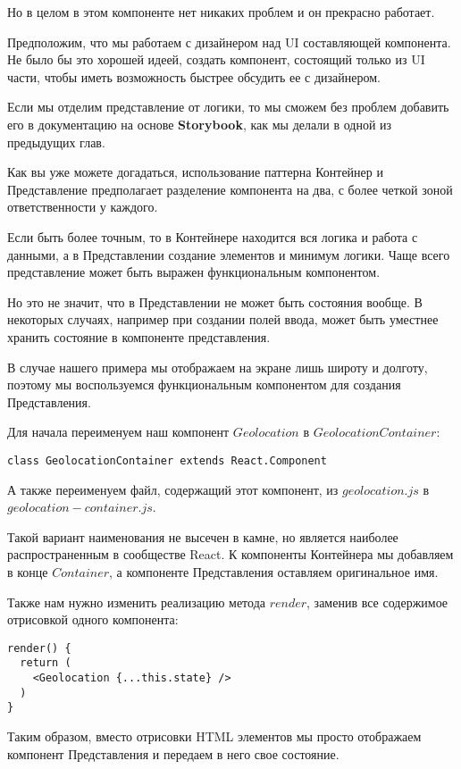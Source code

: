 Но в целом в этом компоненте нет никаких проблем и он прекрасно работает.

Предположим, что мы работаем с дизайнером над UI составляющей компонента. Не было бы это хорошей идеей, создать компонент, состоящий только из UI части, чтобы иметь возможность быстрее обсудить ее с дизайнером.

 Если мы отделим представление от логики, то мы сможем без проблем добавить его в документацию на основе \textbf{Storybook}, как мы делали в одной из предыдущих глав.
 
 Как вы уже можете догадаться, использование паттерна Контейнер и Представление предполагает разделение компонента на два, с более четкой зоной ответственности у каждого.
 
 Если быть более точным, то в Контейнере находится вся логика и работа с данными, а в Представлении создание элементов и минимум логики. Чаще всего представление может быть выражен функциональным компонентом.
 
 Но это не значит, что в Представлении не может быть состояния вообще. В некоторых случаях, например при создании полей ввода, может быть уместнее хранить состояние в компоненте представления.
 
 В случае нашего примера мы отображаем на экране лишь широту и долготу, поэтому мы воспользуемся функциональным компонентом для создания Представления.
 
 Для начала переименуем наш компонент $Geolocation$ в $GeolocationContainer$:
 
\begin{lstlisting}
class GeolocationContainer extends React.Component
\end{lstlisting}

А также переименуем файл, содержащий этот компонент, из $geolocation.js$ в $geolocation-container.js$.

Такой вариант наименования не высечен в камне, но является наиболее распространенным в сообществе React. К компоненты Контейнера мы добавляем в конце $Container$, а компоненте Представления оставляем оригинальное имя.

Также нам нужно изменить реализацию метода $render$, заменив все содержимое отрисовкой одного компонента:

\begin{lstlisting}
render() {
  return (
    <Geolocation {...this.state} />
  )
}
\end{lstlisting}

Таким образом, вместо отрисовки HTML элементов мы просто отображаем компонент Представления и передаем в него свое состояние.

